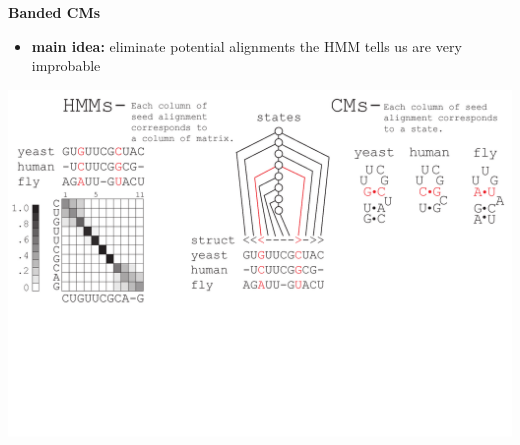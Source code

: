 \documentclass[landscape]{slides}
\begin{document}
\begin{slide}
\begin{center}
\large
\textbf{Banded CMs}
\end{center}
\medskip
\small
\begin{itemize}
\item
\textbf{main idea:} eliminate potential alignments the HMM tells us are very improbable
\end{itemize}
\begin{center}
\includegraphics[width=8in]{figs/post_hmm_to_cm_map2_layer10}
\end{center}
\vfill
\end{slide}
\end{document}
